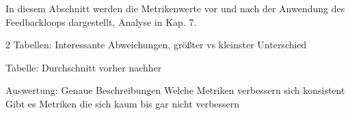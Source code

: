 
In diesem Abschnitt werden die Metrikenwerte vor und nach der Anwendung des Feedbackloops dargestellt, Analyse in Kap. 7.

2 Tabellen: Interessante Abweichungen, größter vs kleinster Unterschied

Tabelle: Durchschnitt vorher nachher

Auswertung:
Genaue Beschreibungen
Welche Metriken verbessern sich konsistent
Gibt es Metriken die sich kaum bis gar nicht verbessern